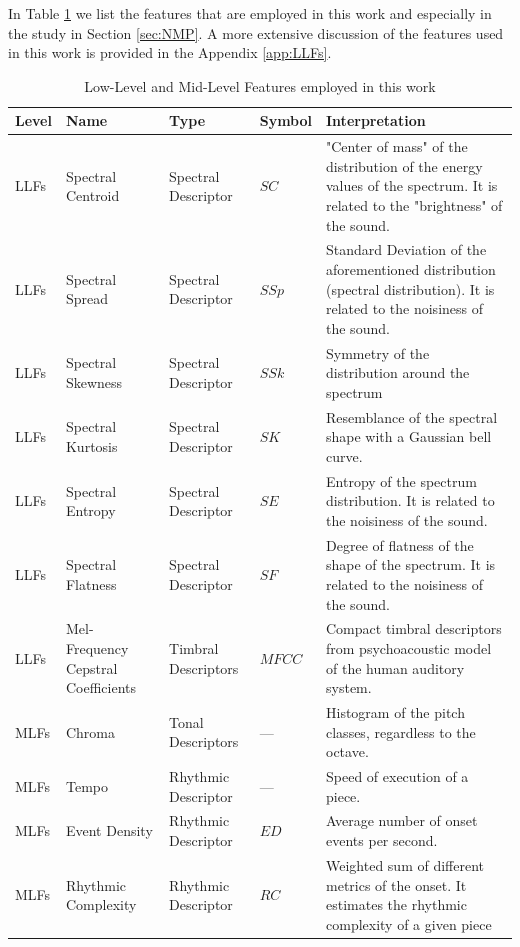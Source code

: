 In Table \ref{tab:LLFs:features} we list the features that are employed in this work and especially in the study in Section \ref{sec:NMP}. A more extensive discussion of the features used in this work is provided in the Appendix \ref{app:LLFs}. 





\begin{table}[!tb]
	
	\vspace{1cm}
	\caption{Low-Level and Mid-Level Features employed in this work}
	\centering %
	\label{tab:LLFs:features}
	\bgroup
	\def\arraystretch{1.5}
	\begin{tabular}{||l|p{1.9cm}|p{1.8cm}|l|p{6cm}||}
		\hline
		\hline
		Level & Name & Type & Symbol & Interpretation \\
		\hline
		\hline
		LLFs & Spectral Centroid & Spectral Descriptor & $SC$ & "Center of mass" of the distribution of the energy values of the spectrum. It is related to the "brightness" of the sound. \\
		\hline
		LLFs & Spectral Spread & Spectral Descriptor & $SSp$ & Standard Deviation of the aforementioned distribution (spectral distribution). It is related to the noisiness of the sound. \\
		\hline
		LLFs & Spectral Skewness & Spectral Descriptor & $SSk$ & Symmetry of the distribution around the spectrum\\		
		\hline
		LLFs & Spectral Kurtosis & Spectral Descriptor & $SK$ & Resemblance of the spectral shape with a Gaussian bell curve. \\
		\hline
		LLFs & Spectral \newline Entropy & Spectral Descriptor & $SE$ & Entropy of the spectrum distribution. It is related to the noisiness of the sound. \\
		\hline
		LLFs & Spectral Flatness & Spectral Descriptor & $SF$ & Degree of flatness of the shape of the spectrum. It is related to the noisiness of the sound. \\
		\hline
		LLFs & Mel-Frequency Cepstral Coefficients & Timbral Descriptors & $MFCC$ & Compact timbral descriptors from psychoacoustic model of the human auditory system. \\
		\hline
		MLFs & Chroma & Tonal Descriptors & --- & Histogram of the pitch classes, regardless to the octave. \\
		\hline
		MLFs & Tempo & Rhythmic Descriptor & --- & Speed of execution of a piece. \\		
		\hline
		MLFs & Event \newline Density & Rhythmic Descriptor & $ED$ & Average number of onset events per second. \\
		\hline
		MLFs & Rhythmic Complexity & Rhythmic Descriptor & $RC$ & Weighted sum of different metrics of the onset. It estimates the rhythmic complexity of a given piece \\		
		\hline
		\hline
	\end{tabular}
	\egroup
	\vspace{1cm}
\end{table}


